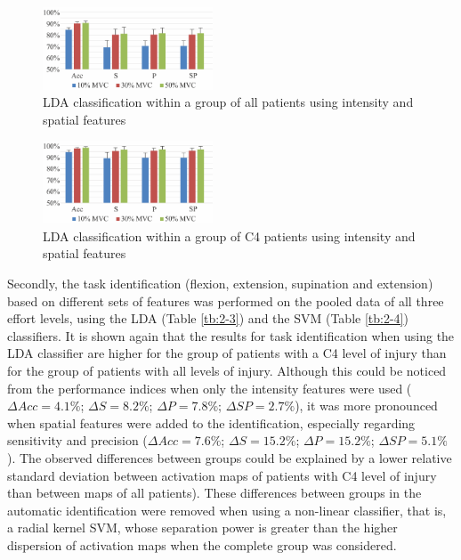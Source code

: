 \begin{figure}[ht]
\centering
\includegraphics[width=0.45\textwidth]{Images/figure2_7.png}
\caption{LDA classification within a group of all patients using intensity and spatial features}
\label{fig:2-7}
\end{figure}      

\begin{figure}[ht]
\centering
\includegraphics[width=0.45\textwidth]{Images/figure2_8.png}
\caption{LDA classification within a group of C4 patients using intensity and spatial features}
\label{fig:2-8}
\end{figure}     

Secondly, the task identification (flexion, extension, supination and extension) based on different sets of features was performed on the pooled data of all three effort levels, using the LDA (Table \ref{tb:2-3}) and the SVM (Table \ref{tb:2-4}) classifiers. It is shown again that the results for task identification when using the LDA classifier are higher for the group of patients with a C4 level of injury than for the group of patients with all levels of injury. Although this could be noticed from the performance indices when only the intensity features were used ($\Delta Acc= 4.1\%$; $\Delta S= 8.2\%$; $\Delta P= 7.8\%$; $\Delta SP= 2.7\%$), it was more pronounced when spatial features were added to the identification, especially regarding sensitivity and precision ($\Delta Acc= 7.6\%$; $\Delta S= 15.2\%$; $\Delta P= 15.2\%$; $\Delta SP= 5.1\%$). The observed differences between groups could be explained by a lower relative standard deviation between activation maps of patients with C4 level of injury than between maps of all patients). These differences between groups in the automatic identification were removed when using a non-linear classifier, that is, a radial kernel SVM, whose separation power is greater than the higher dispersion of activation maps when the complete group was considered.

